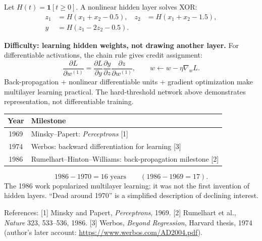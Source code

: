 \documentclass[11pt,a4paper]{article}
\begin{document}
Let $H(t)=\mathbf1[t\ge0]$. A nonlinear hidden layer solves XOR:
\begin{align*}
z_1&=H(x_1+x_2-0.5),&z_2&=H(x_1+x_2-1.5),\\
\boxed{y}&\boxed{=H(z_1-2z_2-0.5)}.&&
\end{align*}
\begin{center}
\end{center}
\textbf{Difficulty: learning hidden weights, not drawing another layer.}
For differentiable activations, the chain rule gives credit assignment:
\[
\frac{\partial L}{\partial w^{(1)}}=
\frac{\partial L}{\partial y}\frac{\partial y}{\partial z}
\frac{\partial z}{\partial w^{(1)}},\qquad
w\leftarrow w-\eta\nabla_wL.
\]
Back-propagation + nonlinear differentiable units + gradient optimization make multilayer learning practical. The hard-threshold network above demonstrates representation, not differentiable training.

\begin{center}\small\begin{tabular}{c|l}\toprule
Year&Milestone\\\midrule
1969&Minsky--Papert: \emph{Perceptrons} [1]\\
1974&Werbos: backward differentiation for learning [3]\\
1986&Rumelhart--Hinton--Williams: back-propagation milestone [2]\\\bottomrule
\end{tabular}\end{center}
\[
\boxed{1986-1970=16\text{ years}}\qquad(1986-1969=17).
\]
The 1986 work popularized multilayer learning; it was not the first invention of hidden layers. ``Dead around 1970'' is a simplified description of declining interest.

{\footnotesize References: [1] Minsky and Papert, \emph{Perceptrons}, 1969.
[2] Rumelhart et al., \emph{Nature} 323, 533--536, 1986.
[3] Werbos, \emph{Beyond Regression}, Harvard thesis, 1974 (author's later account: \url{https://www.werbos.com/AD2004.pdf}).}
\end{document}
